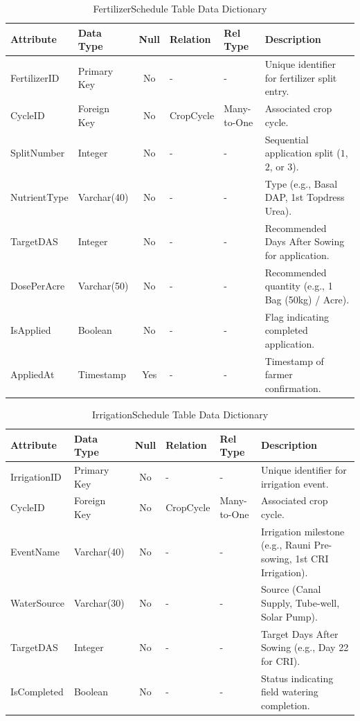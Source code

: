 \documentclass{FastFyp}
\begin{document}
\begin{table}[H]
\footnotesize
\centering
\caption{FertilizerSchedule Table Data Dictionary}
\label{tab:fertilizer_table}
\begin{tabular}{|l|l|c|l|l|p{4.5cm}|}
\hline
\textbf{Attribute} & \textbf{Data Type} & \textbf{Null} & \textbf{Relation} & \textbf{Rel Type} & \textbf{Description} \\ \hline
FertilizerID & Primary Key & No & - & - & Unique identifier for fertilizer split entry. \\ \hline
CycleID & Foreign Key & No & CropCycle & Many-to-One & Associated crop cycle. \\ \hline
SplitNumber & Integer & No & - & - & Sequential application split ($1$, $2$, or $3$). \\ \hline
NutrientType & Varchar(40) & No & - & - & Type (e.g., Basal DAP, 1st Topdress Urea). \\ \hline
TargetDAS & Integer & No & - & - & Recommended Days After Sowing for application. \\ \hline
DosePerAcre & Varchar(50) & No & - & - & Recommended quantity (e.g., 1 Bag (50kg) / Acre). \\ \hline
IsApplied & Boolean & No & - & - & Flag indicating completed application. \\ \hline
AppliedAt & Timestamp & Yes & - & - & Timestamp of farmer confirmation. \\ \hline
\end{tabular}
\end{table}

\begin{table}[H]
\footnotesize
\centering
\caption{IrrigationSchedule Table Data Dictionary}
\label{tab:irrigation_table}
\begin{tabular}{|l|l|c|l|l|p{4.5cm}|}
\hline
\textbf{Attribute} & \textbf{Data Type} & \textbf{Null} & \textbf{Relation} & \textbf{Rel Type} & \textbf{Description} \\ \hline
IrrigationID & Primary Key & No & - & - & Unique identifier for irrigation event. \\ \hline
CycleID & Foreign Key & No & CropCycle & Many-to-One & Associated crop cycle. \\ \hline
EventName & Varchar(40) & No & - & - & Irrigation milestone (e.g., Rauni Pre-sowing, 1st CRI Irrigation). \\ \hline
WaterSource & Varchar(30) & No & - & - & Source (Canal Supply, Tube-well, Solar Pump). \\ \hline
TargetDAS & Integer & No & - & - & Target Days After Sowing (e.g., Day 22 for CRI). \\ \hline
IsCompleted & Boolean & No & - & - & Status indicating field watering completion. \\ \hline
\end{tabular}
\end{table}
\end{document}
